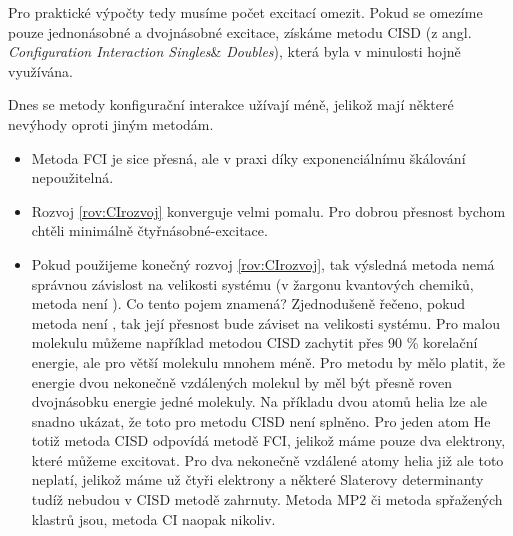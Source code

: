 Pro praktické výpočty tedy musíme počet excitací omezit. Pokud se omezíme pouze jednonásobné a dvojnásobné excitace, získáme metodu CISD (z angl. \textit{Configuration Interaction Singles}\& \textit{Doubles}), která byla v minulosti hojně využívána.

Dnes se metody konfigurační interakce užívají méně, jelikož mají některé nevýhody oproti jiným metodám. 
\begin{itemize}
\item Metoda FCI je sice přesná, ale v praxi díky exponenciálnímu škálování nepoužitelná.
\item Rozvoj \ref{rov:CIrozvoj} konverguje velmi pomalu. Pro dobrou přesnost bychom chtěli minimálně čtyřnásobné-excitace.
\item Pokud použijeme konečný rozvoj \ref{rov:CIrozvoj}, tak výsledná metoda nemá správnou závislost na velikosti systému (v žargonu kvantových chemiků, metoda není ). Co tento pojem znamená? Zjednodušeně řečeno, pokud metoda není , tak její přesnost bude záviset na velikosti systému. Pro malou molekulu můžeme například metodou CISD zachytit přes 90 \% korelační energie, ale pro větší molekulu mnohem méně. Pro  metodu by mělo platit, že energie dvou nekonečně vzdálených molekul by měl být přesně roven dvojnásobku energie jedné molekuly. Na příkladu dvou atomů helia lze ale snadno ukázat, že toto pro metodu CISD není splněno. Pro jeden atom He totiž metoda CISD odpovídá metodě FCI, jelikož máme pouze dva elektrony, které můžeme excitovat. Pro dva nekonečně vzdálené atomy helia již ale toto neplatí, jelikož máme už čtyři elektrony a některé Slaterovy determinanty tudíž nebudou v CISD metodě zahrnuty. 
Metoda MP2 či metoda spřažených klastrů  jsou, metoda CI naopak nikoliv. 
\end{itemize}



